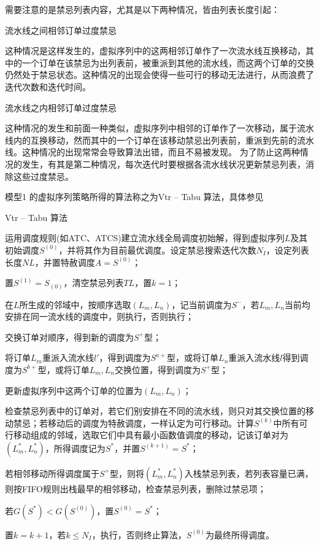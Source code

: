 需要注意的是禁忌列表内容，尤其是以下两种情况，皆由列表长度引起：
\begin{asparaenum}
\item 流水线之间相邻订单过度禁忌

这种情况是这样发生的，虚拟序列中的这两相邻订单作了一次流水线互换移动，其中的一个订单在该禁忌为出列表前，被重派到其他的流水线，而这两个订单的交换仍然处于禁忌状态。这种情况的出现会使得一些可行的移动无法进行，从而浪费了迭代次数和迭代时间。
\item 流水线之内相邻订单过度禁忌
\end{asparaenum}
这种情况的发生和前面一种类似，虚拟序列中相邻的订单作了一次移动，属于流水线内的互换移动，然而其中的一个订单在该移动禁忌出列表前，重派到先前的流水线。这种情况的出现常常会导致算法出错，而且不易被发现。
为了防止这两种情况的发生，有其是第二种情况，每次迭代时要根据各流水线状况更新禁忌列表，消除这些过度禁忌。

模型1 的虚拟序列策略所得的算法称之为Vtr -- Tabu 算法，具体参见

\begin{algori}
Vtr -- Tabu 算法\label{alg:vtrtabu}
\begin{asparaenum}
\renewcommand{\labelenumi}{\bf Step\theenumi~}
\item 运用调度规则(如ATC、ATCS)建立流水线全局调度初始解，得到虚拟序列$L$及其初始调度$S^{(0)}$，并将其作为目前最优调度。设定禁忌搜索迭代次数$N_I$，设定列表长度$NL$，并置特赦调度$A = S^{(0)}$；
\item 置$S^{(1)} = S_{(0)}$，清空禁忌列表$TL$，置$k = 1$；
\item 在$L$所生成的邻域中，按顺序选取$(L_m, L_n)$，记当前调度为$S^-$，若$L_m, L_n$当前均安排在同一流水线的调度中，则执行，否则执行；
\item 交换订单对顺序，得到新的调度为$S^+$型；
\item 将订单$L_m$重派入流水线$l'$，得到调度为$S^{a+}$型，或将订单$L_n$重派入流水线$l$得到调度为$S^{b+}$型，或将订单$L_m, L_n$交换位置，得到调度为$S^+$型；
\item 更新虚拟序列中这两个订单的位置为$(L_m, L_n)$；
\item 检查禁忌列表中的订单对，若它们别安排在不同的流水线，则只对其交换位置的移动禁忌；若移动后的调度为特赦调度，一样认定为可行移动。计算$S^{(k)}$中所有可行移动组成的邻域，选取它们中具有最小函数值调度的移动，记该订单对为$(L_m^*, L_n^*)$，所得调度记为$S^*$，并置$S^{(k+1)} = S^*$；
\item 若相邻移动所得调度属于$S^+$型，则将$(L_m^*, L_n^*)$入栈禁忌列表，若列表容量已满，则按FIFO规则出栈最早的相邻移动，检查禁忌列表，删除过禁忌项；
\item 若$G(S^*) < G(S^{(0)})$，置$S^{(0)} = S^*$；
\item 置$k = k + 1$，若$k\le N_I$，执行，否则终止算法，$S^{(0)}$为最终所得调度。
\end{asparaenum}
\end{algori}

